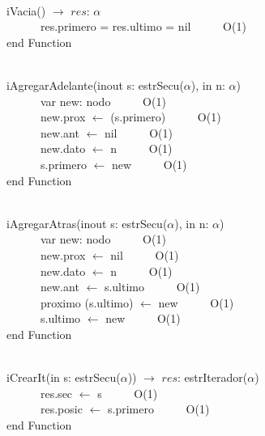 \documentclass[a4paper,10pt]{article}
\begin{document}
\begin{algoritmo}
\caption{}\\
  iVacia() $\rightarrow$ $res$: $\alpha$\\
	\indent \ \ \ \ \ \  res.primero = res.ultimo = nil \ \ \ \ \ O(1)\\
   end Function 
\end{algoritmo}

\begin{algoritmo}
\caption{}\\
  iAgregarAdelante(inout s: estrSecu($\alpha$), in n: $\alpha$)\\
	\indent \ \ \ \ \ \  var new: nodo \ \ \ \ \ O(1)\\
	\indent \ \ \ \ \ \  new.prox $\gets$ (s.primero)  \ \ \ \ \ O(1)\\
	\indent \ \ \ \ \ \  new.ant  $\gets$ nil  \ \ \ \ \ O(1)\\
	\indent \ \ \ \ \ \  new.dato $\gets$ n  \ \ \ \ \ O(1)\\
	\indent \ \ \ \ \ \  s.primero $\gets$ new \ \ \ \ \ O(1)\\
   end Function 
\end{algoritmo}

\begin{algoritmo}
\caption{}\\
  iAgregarAtras(inout s: estrSecu($\alpha$), in n: $\alpha$)\\
	\indent \ \ \ \ \ \  var new: nodo \ \ \ \ \ O(1)\\
	\indent \ \ \ \ \ \  new.prox $\gets$ nil  \ \ \ \ \ O(1)\\
	\indent \ \ \ \ \ \  new.dato  $\gets$ n  \ \ \ \ \ O(1)\\ 
	\indent \ \ \ \ \ \  new.ant  $\gets$ s.ultimo  \ \ \ \ \ O(1)\\ 
	\indent \ \ \ \ \ \  proximo (s.ultimo) $\gets$ new \ \ \ \ \ O(1)\\
	\indent \ \ \ \ \ \  s.ultimo $\gets$ new \ \ \ \ \ O(1)\\
   end Function 
\end{algoritmo}

\begin{algoritmo}
\caption{}\\
  iCrearIt(in s: estrSecu($\alpha$)) $\rightarrow$ $res$: estrIterador($\alpha$)\\
	\indent \ \ \ \ \ \  res.sec $\gets$ s \ \ \ \ \ O(1)\\
	\indent \ \ \ \ \ \  res.posic $\gets$ s.primero  \ \ \ \ \ O(1)\\
   end Function 
\end{algoritmo}
\end{document}

